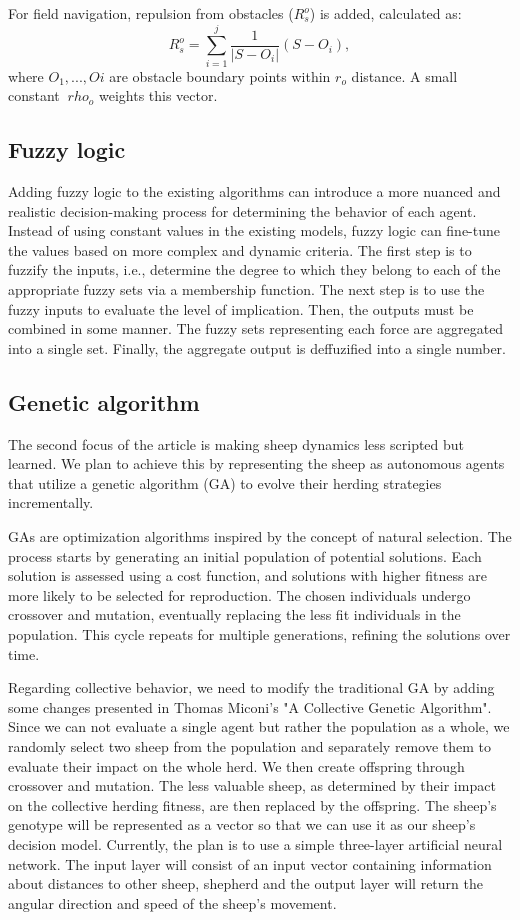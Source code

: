 \documentclass[9pt]{pnas-new}
\begin{document}
\begin{enumerate}
For field navigation, repulsion from obstacles ($R^o_s$) is added, calculated as: $$R^o_s =  \sum^j_{i=1}{\frac{1}{|S - O_i|}(S - O_i)},$$ where $O_1, ..., Oi$ are obstacle boundary points within $r_o$ distance. A small constant $\ rho_o$ weights this vector.
\end{enumerate}

\subsection{Fuzzy logic}
Adding fuzzy logic to the existing algorithms can introduce a more nuanced and realistic decision-making process for determining the behavior of each agent.
Instead of using constant values in the existing models, fuzzy logic can fine-tune the values based on more complex and dynamic criteria.
The first step is to fuzzify the inputs, i.e., determine the degree to which they belong to each of the appropriate fuzzy sets via a membership function.
The next step is to use the fuzzy inputs to evaluate the level of implication.
Then, the outputs must be combined in some manner. The fuzzy sets representing each force are aggregated into a single set. Finally, the aggregate output is deffuzified into a single number.

\subsection{Genetic algorithm}
The second focus of the article is making sheep dynamics less scripted but learned. We plan to achieve this by representing the sheep as autonomous agents that utilize a genetic algorithm (GA) to evolve their herding strategies incrementally. 

GAs are optimization algorithms inspired by the concept of natural selection. The process starts by generating an initial population of potential solutions. Each solution is assessed using a cost function, and solutions with higher fitness are more likely to be selected for reproduction. The chosen individuals undergo crossover and mutation, eventually replacing the less fit individuals in the population. This cycle repeats for multiple generations, refining the solutions over time.

Regarding collective behavior, we need to modify the traditional GA by adding some changes presented in Thomas Miconi's "A Collective Genetic Algorithm"\cite{miconi2001collective}. Since we can not evaluate a single agent but rather the population as a whole, we randomly select two sheep from the population and separately remove them to evaluate their impact on the whole herd. We then create offspring through crossover and mutation. The less valuable sheep, as determined by their impact on the collective herding fitness, are then replaced by the offspring. The sheep's genotype will be represented as a vector so that we can use it as our sheep's decision model. Currently, the plan is to use a simple three-layer artificial neural network. The input layer will consist of an input vector containing information about distances to other sheep, shepherd and the output layer will return the angular direction and speed of the sheep's movement. 
\end{document}
